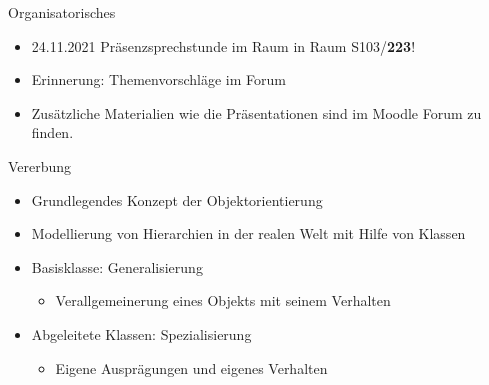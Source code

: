 \documentclass{../tuda-beamer}
\date{17. November 2021}
\begin{document}
  \maketitle

  \begin{frame}{Organisatorisches}
    \begin{itemize}
      \item 24.11.2021 Präsenzsprechstunde im Raum in Raum S103/\textbf{223}!
      \item Erinnerung: Themenvorschläge im Forum
      \item Zusätzliche Materialien wie die Präsentationen sind im Moodle Forum zu finden.
    \end{itemize}
  \end{frame}

  \begin{frame}{Vererbung}
    \begin{itemize}
      \item Grundlegendes Konzept der Objektorientierung
      \item Modellierung von Hierarchien in der realen Welt mit Hilfe von Klassen
      \item Basisklasse: Generalisierung
      \begin{itemize}
        \item Verallgemeinerung eines Objekts mit seinem Verhalten
      \end{itemize}
      \item Abgeleitete Klassen: Spezialisierung
      \begin{itemize}
        \item Eigene Ausprägungen und eigenes Verhalten
      \end{itemize}
    \end{itemize}
  \end{frame}
\end{document}

